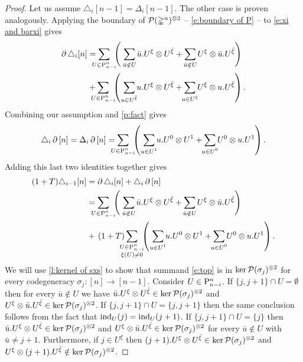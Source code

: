 \begin{proof}
	Let us assume $\triangle_i [n-1] = \Delta_i [n-1]$.
	The other case is proven analogously.
	Applying the boundary of $\cP(\simplex^n)^{\ot 2}$ -- \cref{e:boundary of P} -- to \cref{e:xi and barxi} gives
	\begin{align*}
	\bd \triangle_i [n] & =
	\sum_{\mathclap{U \in \P_{n-i}^n}} \
	\left(\
	\sum_{\mathclap{\bar u \notin U}} \bar u.U^\xi \ot U^\barxi +
	\sum_{\mathclap{\bar u \notin U}} U^\xi \ot \bar u.U^\barxi
	\right) \\ & +
	\sum_{\mathclap{U \in \P_{n-i}^n}} \
	\left(\
	\sum_{\mathclap{u \in U^\barxi}} u.U^\xi \ot U^\barxi +
	\sum_{\mathclap{u \in U^{\xi}}} U^\xi \ot u.U^\barxi
	\right).
	\end{align*}
	Combining our assumption and \cref{p:fact} gives
	\[
	\triangle_i \bd \, [n] =
	\Delta_i \bd \, [n] =
	\sum_{\mathclap{U \in \P_{n-i}^n}} \
	\left(\
	\sum_{\mathclap{u \in U^1}} u.U^0 \ot U^1 +
	\sum_{\mathclap{u \in U^0}} U^0 \ot u.U^1
	\right).
	\]
	Adding this last two identities together gives
	\begin{align}
	(1+T) \triangle_{i-1} [n] &=
	\bd \triangle_i [n] + \triangle_i \bd \, [n] \\ &=
	\label{e:top} \sum_{\mathclap{U \in \P_{n-i}^n}} \
	\left(\
	\sum_{\mathclap{\bar u \notin U}} \bar u.U^\xi \ot U^\barxi +
	\sum_{\mathclap{\bar u \notin U}} U^\xi \ot \bar u.U^\barxi
	\right) \\ &+ \,
	\label{e:bottom} (1+T) \sum_{\mathclap{\substack{U \in \P_{n-i}^n \\ \xi(U) \neq 0}}} \
	\left(\
	\sum_{\mathclap{u \in U^1}} u.U^0 \ot U^1 +
	\sum_{\mathclap{u \in U^0}} U^0 \ot u.U^1
	\right).
	\end{align}
	We will use \cref{l:kernel of sxs} to show that summand \eqref{e:top} is in $\ker \cP(\sigma_j)^{\ot 2}$ for every codegeneracy $\sigma_j \colon [n] \to [n-1]$.
	Consider $U \in \P_{n-i}^n$.
	If $\{j, j+1\} \cap U = \emptyset$ then for every $\bar u \notin U$ we have $\bar u.U^\xi \ot U^\barxi \in \ker \cP(\sigma_j)^{\ot 2}$ and $U^\xi \ot \bar u.U^\barxi \in \ker \cP(\sigma_j)^{\ot 2}$.
	If $\{j, j+1\} \cap U = \{j, j+1\}$ then the same conclusion follows from the fact that $\ind_U(j) = \ind_U(j+1)$.
	If $\{j, j+1\} \cap U = \{j\}$ then $\bar u.U^\xi \ot U^\barxi \in \ker \cP(\sigma_j)^{\ot 2}$ and $U^\xi \ot \bar u.U^\barxi \in \ker \cP(\sigma_j)^{\ot 2}$ for every $\bar u \notin U$ with $\bar u \neq j+1$.
	Furthermore, if $j \in U^\xi$ then $(j+1).U^\xi \ot U^\barxi \in \ker \cP(\sigma_j)^{\ot 2}$ and $U^\xi \ot (j+1).U^\barxi \notin \ker \cP(\sigma_j)^{\ot 2}$.

\end{proof}

